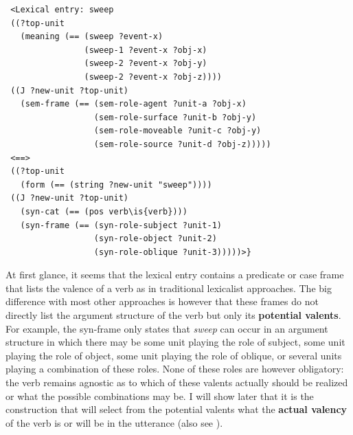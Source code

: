 \ea
\begin{lstlisting}
 <Lexical entry: sweep
 ((?top-unit
   (meaning (== (sweep ?event-x)
                (sweep-1 ?event-x ?obj-x)
                (sweep-2 ?event-x ?obj-y)
                (sweep-2 ?event-x ?obj-z))))
 ((J ?new-unit ?top-unit)
   (sem-frame (== (sem-role-agent ?unit-a ?obj-x)
                  (sem-role-surface ?unit-b ?obj-y)
                  (sem-role-moveable ?unit-c ?obj-y)
                  (sem-role-source ?unit-d ?obj-z)))))
 <==>
 ((?top-unit
   (form (== (string ?new-unit "sweep"))))
 ((J ?new-unit ?top-unit)
   (syn-cat (== (pos verb\is{verb})))
   (syn-frame (== (syn-role-subject ?unit-1)
                  (syn-role-object ?unit-2)
                  (syn-role-oblique ?unit-3)))))>}
\end{lstlisting}
\z


At first glance, it seems that the lexical entry contains a predicate or case frame that lists the valence of a verb as in traditional lexicalist approaches. The big difference with most other approaches is however that these frames do not directly list the argument structure of the verb but only its {\bfseries potential valents}. For example, the syn-frame only states that {\em sweep} can occur in an argument structure in which there may be some unit playing the role of subject, some unit playing the role of object, some unit playing the role of oblique, or several units playing a combination of these roles. None of these roles are however obligatory: the verb remains agnostic as to which of these valents actually should be realized or what the possible combinations may be. I will show later that it is the construction that will select from the potential valents what the {\bfseries actual valency} of the verb is or will be in the utterance (also see ).

